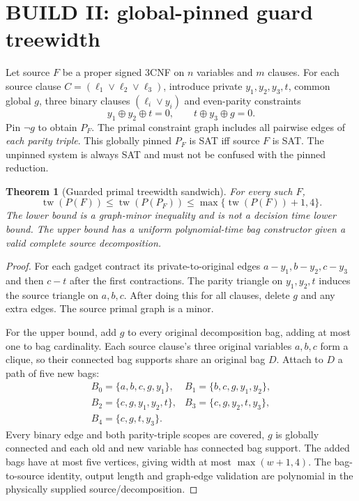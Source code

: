 \documentclass[11pt]{article}
\newtheorem{theorem}{Theorem}
\begin{document}
\section{BUILD II: global-pinned guard treewidth}
Let source $F$ be a proper signed 3CNF on $n$ variables and $m$ clauses. For each source clause $C=(\ell_1\vee\ell_2\vee\ell_3)$, introduce private $y_1,y_2,y_3,t$, common global $g$, three binary clauses $(\ell_i\vee y_i)$ and even-parity constraints
\[
y_1\oplus y_2\oplus t=0,\qquad t\oplus y_3\oplus g=0.
\]
Pin $\neg g$ to obtain $P_F$. The primal constraint graph includes all pairwise edges of \emph{each parity triple}. This globally pinned $P_F$ is SAT iff source $F$ is SAT. The unpinned system is always SAT and must not be confused with the pinned reduction.
\begin{theorem}[Guarded primal treewidth sandwich]
For every such $F$,
\[
\boxed{\operatorname{tw}(P(F))\le\operatorname{tw}(P(P_F))
\le\max\{\operatorname{tw}(P(F))+1,4\}.}
\]
The lower bound is a graph-minor inequality and is \emph{not} a decision time lower bound. The upper bound has a uniform polynomial-time bag constructor given a valid complete source decomposition.
\end{theorem}
\begin{proof}
For each gadget contract its private-to-original edges $a-y_1,b-y_2,c-y_3$ and then $c-t$ after the first contractions. The parity triangle on $y_1,y_2,t$ induces the source triangle on $a,b,c$. After doing this for all clauses, delete $g$ and any extra edges. The source primal graph is a minor.

For the upper bound, add $g$ to every original decomposition bag, adding at most one to bag cardinality. Each source clause's three original variables $a,b,c$ form a clique, so their connected bag supports share an original bag $D$. Attach to $D$ a path of five new bags:
\[
\begin{array}{ll}
B_0=\{a,b,c,g,y_1\},&B_1=\{b,c,g,y_1,y_2\},\\
B_2=\{c,g,y_1,y_2,t\},&B_3=\{c,g,y_2,t,y_3\},\\
B_4=\{c,g,t,y_3\}.&
\end{array}
\]
Every binary edge and both parity-triple scopes are covered, $g$ is globally connected and each old and new variable has connected bag support. The added bags have at most five vertices, giving width at most $\max(w+1,4)$. The bag-to-source identity, output length and graph-edge validation are polynomial in the physically supplied source/decomposition.
\end{proof}
\end{document}

